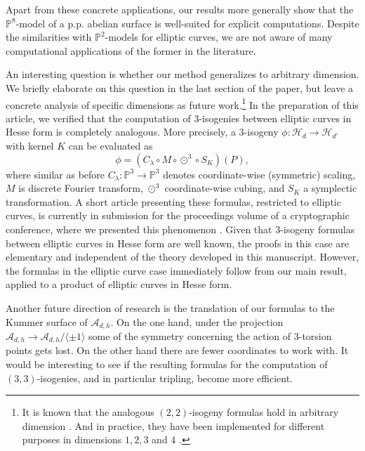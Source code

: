 \documentclass[11pt]{amsart}
\theoremstyle{definition}
\newcommand{\A}{\mathcal{A}}
\renewcommand{\H}{\mathcal{H}}
\newcommand{\HH}{\mathcal{H}}
\let \H\HH
\newcommand{\PP}{\mathbb{P}}
\newcommand{\cube}{\odot^3}
\begin{document}
Apart from these concrete applications, our results more generally show that the $\PP^8$-model of a p.p. abelian surface is well-suited for explicit computations. Despite the similarities with $\PP^2$-models for elliptic curves, we are not aware of many computational applications  of the former in the literature.

An interesting question is whether our method generalizes to arbitrary dimension. We briefly elaborate on this question in the last section of the paper, but leave a concrete analysis of specific dimensions as future work.\footnote{It is known that the analogous  $(2,2)$-isogeny formulas hold in arbitrary dimension \cite{damien-notes}. And in practice, they have been implemented for different purposes in dimensions $1,2,3$ and $4$ \cite{sarkis2024computing,level-2-theta-dimension-2,kunzweiler2025radical,level-2-theta-dimension-4}.} In the preparation of this article, we verified that the computation of $3$-isogenies between elliptic curves in Hesse form is completely analogous. More precisely, a $3$-isogeny $\phi: \H_d \to \H_{d'}$ with kernel $K$ can be evaluated as 
\[
\phi = (C_\lambda  \circ M \circ \cube \circ S_K)(P),
\]
where similar as before $C_\lambda: \PP^3 \to \PP^3$ denotes coordinate-wise (symmetric) scaling, $M$ is discrete Fourier transform, $\cube$ coordinate-wise cubing, and $S_K$  a symplectic transformation.  A short article presenting these formulas, restricted to elliptic curves, is currently in submission for the proceedings volume of a cryptographic conference, where we presented this phenomenon \cite{hessiantripling}.  Given that $3$-isogeny formulas between elliptic curves in Hesse form are well known, the proofs in this case are elementary and independent of the theory developed in this manuscript. However, the formulas in the elliptic curve case immediately follow from our main result, applied to a product of elliptic curves in Hesse form. 

Another future direction of research is the translation of our formulas to the Kummer surface of $\A_{d,h}$. On the one hand, under the projection $\A_{d,h} \to \A_{d,h}/\langle \pm 1\rangle$ some of the symmetry concerning the action of $3$-torsion points gets lost. On the other hand there are fewer coordinates to work with. It would be interesting to see if the resulting formulas for the computation of $(3,3)$-isogenies, and in particular tripling, become more efficient.
\end{document}
